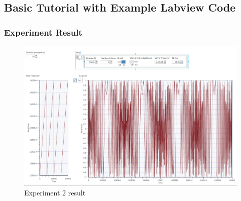 \subsection{Basic Tutorial with Example Labview Code}
    
    \subsubsection*{Experiment Result}
    \vspace{-4mm}  
    \begin{figure}[!h]\raggedleft
    \hspace{15mm}
		\includegraphics[width=.95\textwidth]{image/week03/2-2-1.png}
		\caption{\footnotesize Experiment 2 result}
		\vspace{-10pt}
    \end{figure}
\clearpage